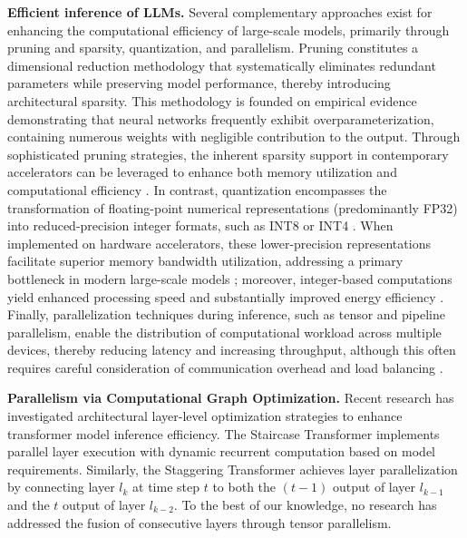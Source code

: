 \begin{figure*}[h!]
{}
\label{fig:matrices}
\end{figure*}


\textbf{Efficient inference of LLMs.} Several complementary approaches exist for enhancing the computational efficiency of large-scale models, primarily through pruning and sparsity, quantization, and parallelism. Pruning\cite{LeCun1989OptimalBD, han2015learningweightsconnectionsefficient, han2016deepcompressioncompressingdeep, frantar2023sparsegpt} constitutes a dimensional reduction methodology that systematically eliminates redundant parameters while preserving model performance, thereby introducing architectural sparsity. This methodology is founded on empirical evidence demonstrating that neural networks frequently exhibit overparameterization, containing numerous weights with negligible contribution to the output. Through sophisticated pruning strategies, the inherent sparsity support in contemporary accelerators can be leveraged to enhance both memory utilization and computational efficiency \citep{zhang2020sparch, Spatten21}. In contrast, quantization encompasses the transformation of floating-point numerical representations (predominantly FP32) into reduced-precision integer formats, such as INT8 or INT4 \cite{han2016deepcompressioncompressingdeep, jacob2018quantization}. When implemented on hardware accelerators, these lower-precision representations facilitate superior memory bandwidth utilization, addressing a primary bottleneck in modern large-scale models \cite{gholami2024ai}; moreover, integer-based computations yield enhanced processing speed and substantially improved energy efficiency \cite{horowitz20141}. Finally, parallelization techniques during inference, such as tensor and pipeline parallelism, enable the distribution of computational workload across multiple devices, thereby reducing latency and increasing throughput, although this often requires careful consideration of communication overhead and load balancing \cite{li2024tpillmserving70bscalellms, narayanan2021efficientlargescalelanguagemodel}.





\textbf{Parallelism via Computational Graph Optimization.} Recent research has investigated architectural layer-level optimization strategies to enhance transformer model inference efficiency. The Staircase Transformer \citep{cutler2025stagformertimestaggeringtransformer} implements parallel layer execution with dynamic recurrent computation based on model requirements. Similarly, the Staggering Transformer \citep{cai2024medusasimplellminference} achieves layer parallelization by connecting layer $l_k$ at time step $t$ to both the $(t-1)$ output of layer $l_{k-1}$ and the $t$ output of layer $l_{k-2}$. To the best of our knowledge, no research has addressed the fusion of consecutive layers through tensor parallelism.